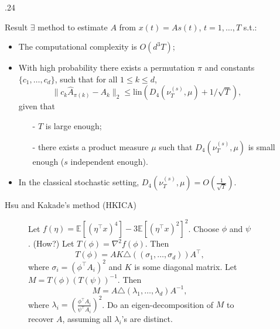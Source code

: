 \documentclass[final]{beamer} %
\newcommand{\EEp}[1]{\mathbb{E}\left[#1\right]}
\begin{document}
\begin{frame}[c]
\begin{columns}[t,totalwidth=\textwidth]
\begin{column}{.24\textwidth}
	\end{column}
	\begin{column}{0.01\textwidth}
	\end{column}
	\begin{column} {.24\textwidth}
		\begin{block}{Result}
			$\exists$ method to estimate $A$ from $x(t)=A s(t)$, $t=1,\dots,T$ s.t.:
			\begin{itemize}
				\item The computational complexity is $O(d^3 T)$;
				\item With high probability there exists a permutation $\pi$ and constants $\{c_1,\ldots,c_d\}$, such that for all $1\le k\le d$, 
				\[\| c_k\hat{A}_{\pi(k)} - A_k\|_2 \le \mathrm{lin}(D_4(\nu_T^{(s)},\mu)+1/\sqrt{T}),\]
				given that 
				\begin{itemize}
					\item[-]  $T$ is large enough;
					\item[-]  there exists a product measure $\mu$ such that $D_4(\nu_T^{(s)},\mu)$ is small enough ($s$ independent enough).
				\end{itemize}
				\item  In the classical stochastic setting, $D_4(\nu_T^{(s)},\mu)= O(\frac{1}{\sqrt{T}})$.
			\end{itemize}
		\end{block}
		\vspace{0.5ex}
		\begin{block}{Hsu and Kakade's method (HKICA)}
			\begin{figure}
			\begin{algorithmic}[1]
				\STATE Let $f(\eta) = \EEp{(\eta^{\top}x)^4} - 3 \EEp{(\eta^{\top}x)^2}^2$.
				\STATE  Choose $\phi$ and $\psi$. (How?)
				\STATE Let $T(\phi) = \nabla^2 f(\phi)$. Then 
					\[T(\phi) = AK \triangle\left( (\sigma_1,\ldots,  \sigma_d)\right)A^{\top},
					\]
					where $\sigma_i = \left(\phi^{\top}A_i\right)^2$ and $K$ is some diagonal matrix.
				\STATE Let $M = T(\phi)(T(\psi))^{-1}$. Then 
					\[M = A \triangle \left( \lambda_1, \ldots, \lambda_d \right) A^{-1},
					\]
					where $\lambda_i = \left(\frac{\phi^{\top}A_i}{\psi^{\top}A_i}\right)^2$.
				\STATE Do an eigen-decomposition of $M$ to recover $A$, assuming all $\lambda_i$'s are distinct.
			\end{algorithmic}

\end{figure}
\end{block}
\end{column}
\end{columns}
\end{frame}
\end{document}
